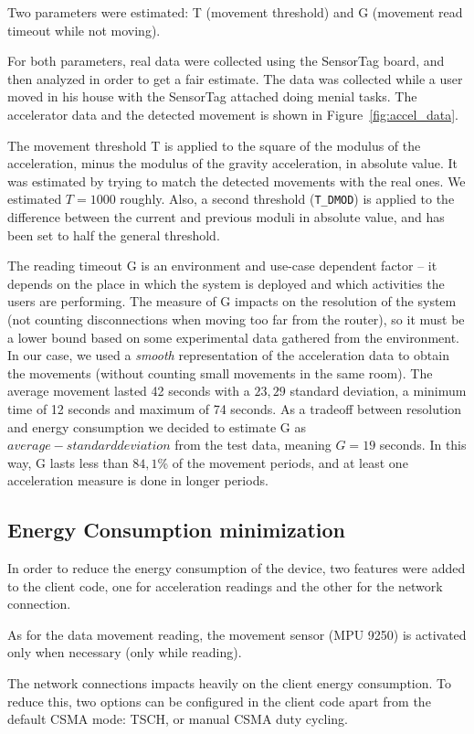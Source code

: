 \documentclass[a4paper, 10pt]{article}
\begin{document}
Two parameters were estimated: T (movement threshold) and G (movement read timeout while not moving).

For both parameters, real data were collected using the SensorTag board, and then analyzed in order to get a fair estimate.
The data was collected while a user moved in his house with the SensorTag attached doing menial tasks.
The accelerator data and the detected movement is shown in Figure~\ref{fig:accel_data}.

The movement threshold T is applied to the square of the modulus of the acceleration, minus the modulus of the gravity acceleration, in absolute value. It was estimated by trying to match the detected movements with the real ones. We estimated $T = 1000$ roughly. Also, a second threshold (\texttt{T\_DMOD}) is applied to the difference between the current and previous moduli in absolute value, and has been set to half the general threshold.

The reading timeout G is an environment and use-case dependent factor -- it depends on the place in which the system is deployed and which activities the users are performing.
The measure of G impacts on the resolution of the system (not counting disconnections when moving too far from the router), so it must be a lower bound based on some experimental data gathered from the environment.
In our case, we used a \emph{smooth} representation of the acceleration data to obtain the movements (without counting small movements in the same room).
The average movement lasted 42 seconds with a $23,29$ standard deviation, a minimum time of 12 seconds and maximum of 74 seconds.
As a tradeoff between resolution and energy consumption we decided to estimate G as $average - standard deviation$ from the test data, meaning $G = 19$ seconds.
In this way, G lasts less than $84,1$\% of the movement periods, and at least one acceleration measure is done in longer periods.

\subsection*{Energy Consumption minimization}
In order to reduce the energy consumption of the device, two features were added to the client code, one for acceleration readings and the other for the network connection.

As for the data movement reading, the movement sensor (MPU 9250) is activated only when necessary (only while reading). 

The network connections impacts heavily on the client energy consumption. To reduce this, two options can be configured in the client code apart from the default CSMA mode: TSCH, or manual CSMA duty cycling.
\end{document}
